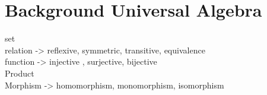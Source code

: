 \chapter{Background Universal Algebra}
set\\
relation -> reflexive, symmetric, transitive, equivalence \\
function -> injective , surjective, bijective\\
Product\\
Morphism -> homomorphism, monomorphism, isomorphism\\